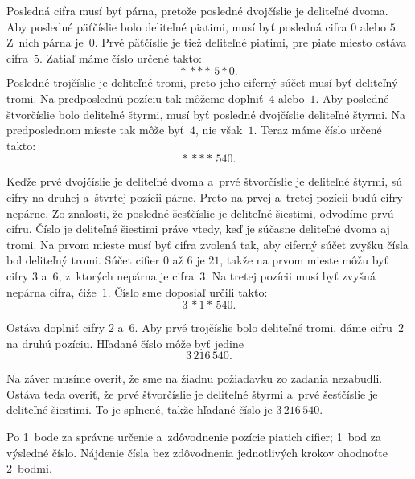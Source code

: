 {%
Posledná cifra musí byť párna, pretože posledné dvojčíslie je deliteľné dvoma.
Aby posledné päťčíslie bolo deliteľné piatimi, musí byť posledná cifra $0$ alebo $5$.
Z~nich párna je~$0$.
Prvé päťčíslie je tiež deliteľné piatimi, pre piate miesto ostáva cifra~$5$.
Zatiaľ máme číslo určené takto:
$$
*\,***\,5*0.
$$
Posledné trojčíslie je deliteľné tromi, preto jeho ciferný súčet musí byť deliteľný tromi.
Na predposlednú pozíciu tak môžeme doplniť~$4$ alebo~$1$.
Aby posledné štvorčíslie bolo deliteľné štyrmi, musí byť posledné dvojčíslie deliteľné štyrmi.
Na predposlednom mieste tak môže byť~$4$, nie však~$1$.
Teraz máme číslo určené takto:
$$
*\,***\,540.
$$

Keďže prvé dvojčíslie je deliteľné dvoma a~prvé štvorčíslie je deliteľné štyrmi,
sú cifry na druhej a~štvrtej pozícii párne. Preto na prvej a~tretej pozícii budú cifry nepárne.
Zo znalosti, že posledné šesťčíslie je deliteľné šiestimi, odvodíme prvú cifru.
Číslo je deliteľné šiestimi práve vtedy, keď je súčasne deliteľné dvoma aj tromi.
Na prvom mieste musí byť cifra zvolená tak, aby ciferný súčet zvyšku čísla bol deliteľný tromi.
Súčet cifier $0$ až $6$ je $21$, takže na prvom mieste môžu byť cifry $3$ a~$6$, z~ktorých nepárna je cifra~$3$.
Na tretej pozícii musí byť zvyšná nepárna cifra, čiže~$1$.
Číslo sme doposiaľ určili takto:
$$
3\,*1*\,540.
$$

Ostáva doplniť cifry $2$ a~$6$.
Aby prvé trojčíslie bolo deliteľné tromi, dáme cifru~$2$ na druhú pozíciu.
Hľadané číslo môže byť jedine
$$
3\,216\,540.
$$

Na záver musíme overiť, že sme na žiadnu požiadavku zo zadania nezabudli.
Ostáva teda overiť, že prvé štvorčíslie je deliteľné štyrmi a~prvé šesťčíslie
je deliteľné šiestimi.
To je splnené, takže hľadané číslo je $3\,216\,540$.

\hodnotenie
Po 1~bode za správne určenie a~zdôvodnenie pozície piatich cifier;
1~bod za výsledné číslo.
Nájdenie čísla bez zdôvodnenia jednotlivých krokov ohodnoťte 2~bodmi.
\endhodnotenie}

